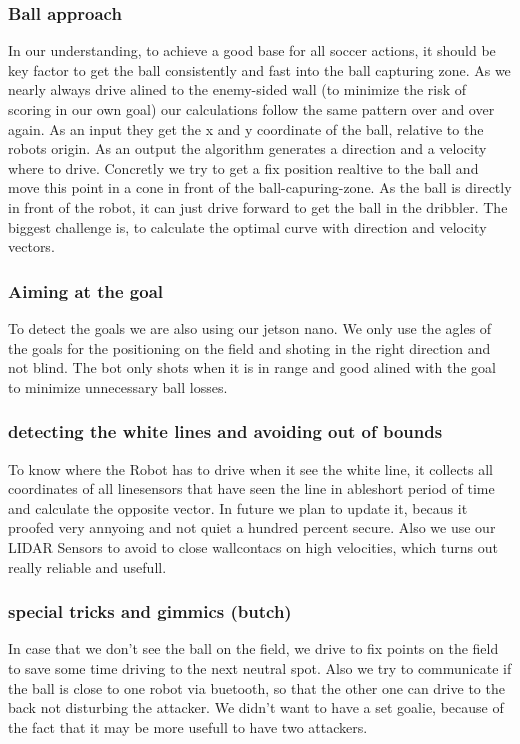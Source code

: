 \documentclass{scrartcl}
\begin{document}
 \subsubsection{Ball approach}
 In our understanding, to achieve a good base for all soccer actions, it should be key factor to get the ball 
 consistently and fast into the ball capturing zone.
 As we nearly always drive alined to the enemy-sided wall (to minimize the risk of scoring in our own goal) our 
 calculations follow the same pattern over and over again. As an input they get the x and y coordinate of the 
 ball, relative to the robots origin. As an output the algorithm generates a direction and a velocity where to drive. 
 Concretly we try to get a fix position realtive to the ball and move this point in a cone in front of the ball-capuring-zone.
 As the ball is directly in front of the robot, it can just drive forward to get the ball in the dribbler. The biggest challenge is,
 to calculate the optimal curve with direction and velocity vectors.
 \subsubsection{Aiming at the goal}
 To detect the goals we are also using our jetson nano. We only use the agles of the goals for the positioning on the field
 and shoting in the right direction and not blind. The bot only shots when it is in range and good alined with the goal to minimize unnecessary ball losses.

 \subsubsection{detecting the white lines and avoiding out of bounds}
 To know where the Robot has to drive when it see the white line, it collects all coordinates of all linesensors that have seen the line in ableshort period of time
 and calculate the opposite vector. In future we plan to update it, becaus it proofed very annyoing and not quiet a hundred percent secure.
 Also we use our LIDAR Sensors to avoid to close wallcontacs on high velocities, which turns out really reliable and usefull.

 \subsubsection{special tricks and gimmics (butch)}
 In case that we don't see the ball on the field, we drive to fix points on the field to save some time driving to the next neutral spot.
 Also we try to communicate if the ball is close to one robot via buetooth, so that the other one can drive to the back not disturbing the attacker.
 We didn't want to have a set goalie, because of the fact that it may be more usefull to have two attackers.
\end{document}
